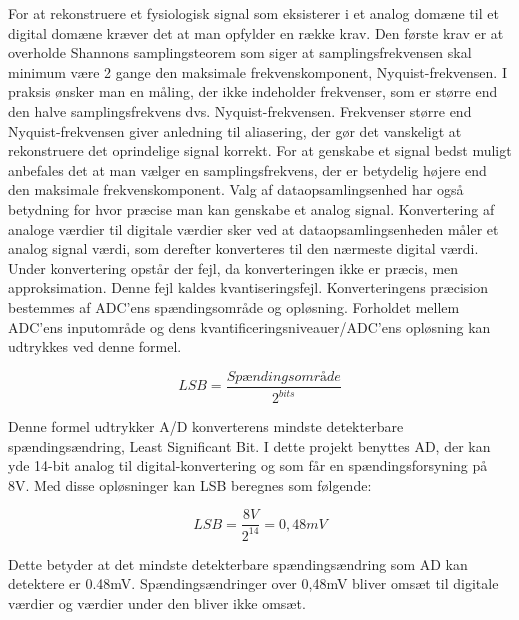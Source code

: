 For at rekonstruere et fysiologisk signal som eksisterer i et analog domæne til et digital domæne kræver det at man opfylder en række krav. Den første krav er at overholde Shannons samplingsteorem som siger at samplingsfrekvensen skal minimum være 2 gange den maksimale frekvenskomponent, Nyquist-frekvensen. I praksis ønsker man en måling, der ikke indeholder frekvenser, som er større end den halve samplingsfrekvens dvs. Nyquist-frekvensen. Frekvenser større end Nyquist-frekvensen giver anledning til aliasering, der gør det vanskeligt at rekonstruere det oprindelige signal korrekt. For at genskabe et signal bedst muligt anbefales det at man vælger en samplingsfrekvens, der er betydelig højere end den maksimale frekvenskomponent. Valg af dataopsamlingsenhed har også betydning for hvor præcise man kan genskabe et analog signal. Konvertering af analoge værdier til digitale værdier sker ved at dataopsamlingsenheden måler et analog signal værdi, som derefter konverteres til den nærmeste digital værdi. Under konvertering opstår der fejl, da konverteringen ikke er præcis, men approksimation. Denne fejl kaldes kvantiseringsfejl.  Konverteringens præcision bestemmes af ADC'ens spændingsområde og opløsning. Forholdet mellem ADC'ens inputområde og dens kvantificeringsniveauer/ADC’ens opløsning kan udtrykkes ved denne formel.

\begin{equation}
\label{eq2.1}
 LSB=  \dfrac{{Spændingsområde}}{2^{bits}} 
\end{equation}

Denne formel udtrykker A/D konverterens mindste detekterbare spændingsændring, Least Significant Bit. I dette projekt benyttes AD, der kan yde 14-bit analog til digital-konvertering og som får en spændingsforsyning på 8V. Med disse opløsninger kan LSB beregnes som følgende:

 \begin{equation}
\label{eq2.2}
 LSB=  \dfrac{{8V}}{2^{14}}=0,48mV 
\end{equation}
 
 Dette betyder at det mindste detekterbare spændingsændring som AD kan detektere er 0.48mV. Spændingsændringer over 0,48mV bliver omsæt til digitale værdier og værdier under den bliver ikke omsæt. 
 
 

